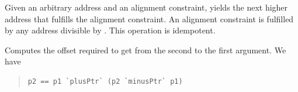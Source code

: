 \begin{haddockdesc}
\item[\begin{tabular}{@{}l}
alignPtr :: Ptr a -> Int -> Ptr a
\end{tabular}]
{\haddockbegindoc
Given an arbitrary address and an alignment constraint,
  yields the next higher address that fulfills the
 alignment constraint.  An alignment constraint  is fulfilled by
 any address divisible by .  This operation is idempotent.\par}
\end{haddockdesc}
\begin{haddockdesc}
\item[\begin{tabular}{@{}l}
minusPtr :: Ptr a -> Ptr b -> Int
\end{tabular}]
{\haddockbegindoc
Computes the offset required to get from the second to the first
 argument.  We have\par
\begin{quote}
{\haddockverb\begin{verbatim}
p2 == p1 `plusPtr` (p2 `minusPtr` p1)\end{verbatim}}
\end{quote}}
\end{haddockdesc}
